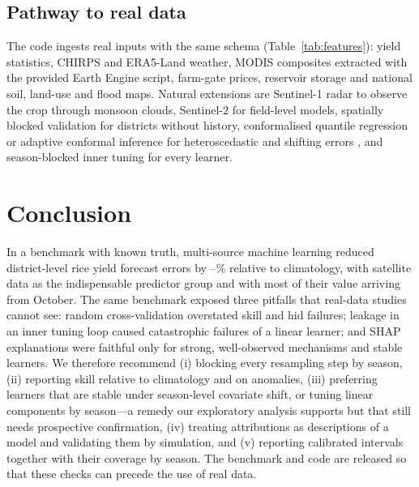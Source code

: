 \subsection{Pathway to real data}
The code ingests real inputs with the same schema (Table~\ref{tab:features}): yield statistics, CHIRPS and ERA5-Land weather, MODIS composites extracted with the provided Earth Engine script, farm-gate prices, reservoir storage and national soil, land-use and flood maps. Natural extensions are Sentinel-1 radar to observe the crop through monsoon clouds, Sentinel-2 for field-level models, spatially blocked validation for districts without history, conformalised quantile regression or adaptive conformal inference for heteroscedastic and shifting errors \citep{romano2019conformalized,gibbs2021adaptive}, and season-blocked inner tuning for every learner.

\section{Conclusion}\label{sec:conclusion}
In a benchmark with known truth, multi-source machine learning reduced district-level rice yield forecast errors by \redClimPct--\redClimLGBPct\% relative to climatology, with satellite data as the indispensable predictor group and with most of their value arriving from October. The same benchmark exposed three pitfalls that real-data studies cannot see: random cross-validation overstated skill and hid failures; leakage in an inner tuning loop caused catastrophic failures of a linear learner; and SHAP explanations were faithful only for strong, well-observed mechanisms and stable learners. We therefore recommend (i) blocking every resampling step by season, (ii) reporting skill relative to climatology and on anomalies, (iii) preferring learners that are stable under season-level covariate shift, or tuning linear components by season---a remedy our exploratory analysis supports but that still needs prospective confirmation, (iv) treating attributions as descriptions of a model and validating them by simulation, and (v) reporting calibrated intervals together with their coverage by season. The benchmark and code are released so that these checks can precede the use of real data.
